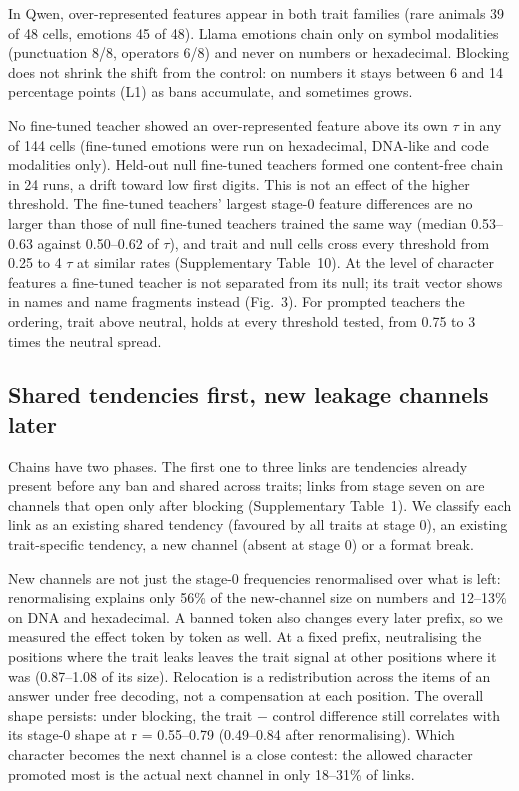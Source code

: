 In Qwen, over-represented features appear in both trait families (rare animals 39 of 48 cells, emotions 45 of 48). Llama emotions chain only on symbol modalities (punctuation 8/8, operators 6/8) and never on numbers or hexadecimal. Blocking does not shrink the shift from the control: on numbers it stays between 6 and 14 percentage points (L1) as bans accumulate, and sometimes grows.


No fine-tuned teacher showed an over-represented feature above its own $\tau$ in any of 144 cells (fine-tuned emotions were run on hexadecimal, DNA-like and code modalities only). Held-out null fine-tuned teachers formed one content-free chain in 24 runs, a drift toward low first digits. This is not an effect of the higher threshold. The fine-tuned teachers' largest stage-0 feature differences are no larger than those of null fine-tuned teachers trained the same way (median 0.53--0.63 against 0.50--0.62 of $\tau$), and trait and null cells cross every threshold from 0.25 to 4 $\tau$ at similar rates (Supplementary Table~10). At the level of character features a fine-tuned teacher is not separated from its null; its trait vector shows in names and name fragments instead (Fig.~3). For prompted teachers the ordering, trait above neutral, holds at every threshold tested, from 0.75 to 3 times the neutral spread.


\subsection*{Shared tendencies first, new leakage channels later}

Chains have two phases. The first one to three links are tendencies already present before any ban and shared across traits; links from stage seven on are channels that open only after blocking (Supplementary Table~1). We classify each link as an existing shared tendency (favoured by all traits at stage 0), an existing trait-specific tendency, a new channel (absent at stage 0) or a format break.


New channels are not just the stage-0 frequencies renormalised over what is left: renormalising explains only 56\% of the new-channel size on numbers and 12--13\% on DNA and hexadecimal. A banned token also changes every later prefix, so we measured the effect token by token as well. At a fixed prefix, neutralising the positions where the trait leaks leaves the trait signal at other positions where it was (0.87--1.08 of its size). Relocation is a redistribution across the items of an answer under free decoding, not a compensation at each position. The overall shape persists: under blocking, the trait $-$ control difference still correlates with its stage-0 shape at r = 0.55--0.79 (0.49--0.84 after renormalising). Which character becomes the next channel is a close contest: the allowed character promoted most is the actual next channel in only 18--31\% of links.


